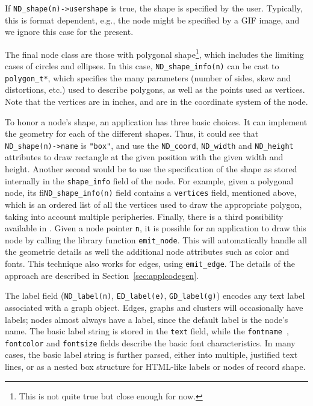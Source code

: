 If \verb+ND_shape(n)->usershape+ is true, the shape
is specified by the user. Typically, this is format dependent, e.g.,
the node might be specified by a GIF image, and we ignore this case
for the present. 

The final node class are those with polygonal shape\footnote{This
is not quite true but close enough for now.}, which includes the limiting
cases of circles and ellipses. In this case,
\verb+ND_shape_info(n)+ can be cast to \verb+polygon_t*+, which specifies
the many parameters (number of sides, skew and distortions, etc.)
used to describe polygons, as well as the points used as vertices. 
Note that the vertices are in inches, and are in the coordinate system
of the node.

To honor a node's shape, an application has three basic choices. It
can implement the geometry for each of the different shapes.
Thus, it could see that \verb+ND_shape(n)->name+ is {\tt "box"}, and
use the {\tt ND\_coord}, {\tt ND\_width} and {\tt ND\_height} attributes to draw
rectangle at the given position with the given width and  height.
Another second would be
to use the specification of the shape as stored internally in the
{\tt shape\_info} field of the node. For example, given a polygonal node,
its fi\verb+ND_shape_info(n)+ field contains a {\tt vertices} field,
mentioned above, which is an ordered list of all the vertices used
to draw the appropriate polygon, taking into account multiple peripheries. 
Finally, there is a third possibility available in \gviz. 
Given a node pointer {\tt n}, it is possible for an application to draw 
this node by calling the library function \verb+emit_node+.
This will automatically handle
all the geometric details as well the additional node attributes such
as color and fonts. This technique also works for edges, using
{\tt emit\_edge}. The details of the approach are described in 
Section~\ref{sec:applcodegen}.

The label field (\verb+ND_label(n)+, \verb+ED_label(e)+,
\verb+GD_label(g)+) encodes any text label associated with a graph object.
Edges, graphs and clusters will occasionally have labels; nodes
almost always have a label, since the default label is the node's name.
The basic label string is stored in the {\tt text} field, while the
{\tt fontname }, {\tt fontcolor} and {\tt fontsize} fields describe
the basic font characteristics.
In many cases, the basic label string is further parsed, either into
multiple, justified text lines, or as a nested box structure for
HTML-like labels or nodes of record shape.
